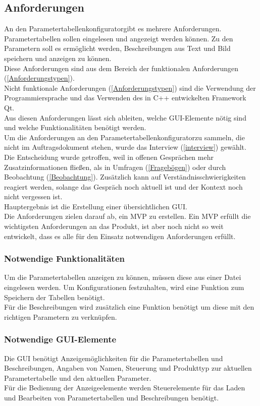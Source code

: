 \subsection{Anforderungen}
\label{Anfs} 
An den \glqq Parametertabellenkonfigurator\grqq\space gibt es mehrere Anforderungen. \\
Parametertabellen sollen eingelesen und angezeigt werden können. Zu den Parametern soll es ermöglicht werden, Beschreibungen aus Text und Bild speichern und anzeigen zu können.\\
Diese Anforderungen sind aus dem Bereich der funktionalen Anforderungen (\ref{Anforderungstypen}).\\
Nicht funktionale Anforderungen (\ref{Anforderungstypen}) sind die Verwendung der Programmiersprache und das Verwenden des in C++ entwickelten Framework Qt.\\
Aus diesen Anforderungen lässt sich ableiten, welche \ac{GUI}-Elemente nötig sind und welche Funktionalitäten benötigt werden.\\
Um die Anforderungen an den \glqq Parametertabellenkonfigurator\grqq\space zu sammeln, die nicht im Auftragsdokument stehen, wurde das Interview (\ref{interview}) gewählt. Die Entscheidung wurde getroffen, weil in offenen Gesprächen mehr Zusatzinformationen fließen, als in Umfragen (\ref{Fragebögen}) oder durch Beobachtung (\ref{Beobachtung}). Zusätzlich kann auf Verständnisschwierigkeiten reagiert werden, solange das Gespräch noch aktuell ist und der Kontext noch nicht vergessen ist.\\
Hauptergebnis ist die Erstellung einer übersichtlichen \ac{GUI}.\\
Die Anforderungen zielen darauf ab, ein \ac{MVP} zu erstellen. Ein \ac{MVP} erfüllt die wichtigsten Anforderungen an das Produkt, ist aber noch nicht so weit entwickelt, dass es alle für den Einsatz notwendigen Anforderungen erfüllt.
\subsubsection{Notwendige Funktionalitäten}
Um die Parametertabellen anzeigen zu können, müssen diese aus einer Datei eingelesen werden. Um Konfigurationen festzuhalten, wird eine Funktion zum Speichern der Tabellen benötigt. \\
Für die Beschreibungen wird zusätzlich eine Funktion benötigt um diese mit den richtigen Parametern zu verknüpfen. \\
\subsubsection{Notwendige GUI-Elemente}
Die \ac{GUI} benötigt Anzeigemöglichkeiten für die Parametertabellen und Beschreibungen, Angaben von Namen, Steuerung und Produkttyp zur aktuellen Parametertabelle und den aktuellen Parameter.\\
Für die Bedienung der Anzeigeelemente werden Steuerelemente für das Laden und Bearbeiten von Parametertabellen und Beschreibungen benötigt.
